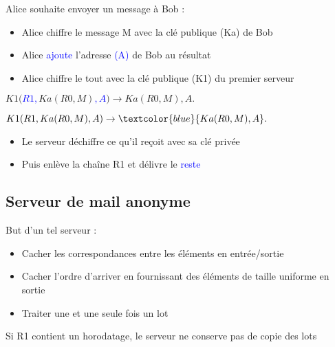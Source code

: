 \documentclass{beamer}
\begin{document}
\begin{frame}
Alice souhaite envoyer un message à Bob :
\begin{itemize}
[triangle]
\item Alice chiffre le message M avec la clé publique (Ka) de Bob
\item Alice \textcolor{blue}{ajoute} l'adresse \textcolor{blue}{(A)} de Bob au résultat
\item Alice chiffre le tout avec la clé publique (K1) du premier serveur
\end{itemize}
\begin{center}
$K1( $\textcolor{blue}{$R1, $}$Ka( R0, M )$\textcolor{blue}{$, A$}$ ) \rightarrow Ka( R0, M ), A.$
\end{center}
\end{frame}

\begin{frame}
\begin{center}
$K1( R1, Ka( R0, M ), A ) \rightarrow \textcolor{blue}{Ka( R0, M ), A}.$
\end{center}

\begin{itemize}
[triangle]
\item Le serveur déchiffre ce qu'il reçoit avec sa clé privée
\item Puis enlève la chaîne R1 et délivre le \textcolor{blue}{reste}
\end{itemize}
\end{frame}

\subsection{Serveur de mail anonyme}
\begin{frame}
But d'un tel serveur :
\begin{itemize}
[triangle]
\item Cacher les correspondances entre les éléments en entrée/sortie
\item Cacher l'ordre d'arriver en fournissant des éléments de taille uniforme en sortie
\item Traiter une et une seule fois un lot
\end{itemize}
Si R1 contient un horodatage, le serveur ne conserve pas de copie des lots
\end{frame}
\end{document}
